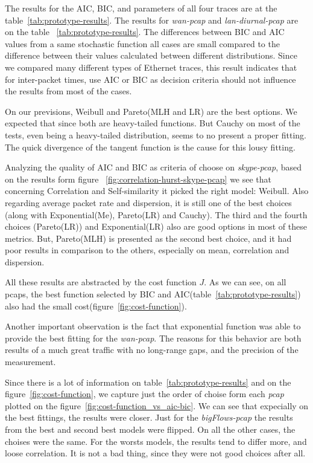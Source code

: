 The results for the AIC, BIC, and parameters of all four traces are at the table~\ref{tab:prototype-results}.  The results for \textit{wan-pcap} and \textit{lan-diurnal-pcap} are on the table ~\ref{tab:prototype-results}. The differences between BIC and AIC values from a same stochastic function all cases are small compared to the difference between their values calculated between different distributions. Since we compared many different types of Ethernet traces, this result indicates that for inter-packet times, use AIC or BIC as decision criteria should not influence the results from most of the cases. 

On our previsions, Weibull and Pareto(MLH and LR) are the best options. We expected that since both are heavy-tailed functions. But Cauchy on most of the tests, even being a heavy-tailed distribution, seems to no present a proper fitting. The quick divergence of the tangent function is the cause for this lousy fitting.

Analyzing the quality of AIC and BIC as criteria of choose on \textit{skype-pcap}, based on the results form figure ~\ref{fig:correlation-hurst-skype-pcap} we see that concerning Correlation and Self-similarity it picked the right model: Weibull. Also regarding average packet rate and dispersion, it is still one of the best choices (along with Exponential(Me), Pareto(LR) and Cauchy). The third and the fourth choices (Pareto(LR)) and Exponential(LR) also are good options in most of these metrics. But, Pareto(MLH) is presented as the second best choice, and it had poor results in comparison to the others, especially on mean, correlation and dispersion. 

All these results are abstracted by the cost function $J$. As we can see, on all pcaps, the best function selected by BIC and AIC(table~\ref{tab:prototype-results}) also had the small cost(figure~\ref{fig:cost-function}). 

Another important observation is the fact that exponential function was able to provide the best fitting for the \textit{wan-pcap}. The reasons for this behavior are both results of a much great traffic with no long-range gaps, and the precision of the measurement.


Since there is a lot of information on table~\ref{tab:prototype-results} and on the figure~\ref{fig:cost-function}, we capture just the order of choise form each \textit{pcap} plotted on the figure~\ref{fig:cost-function_vs_aic-bic}. We can see that expecially on the best fittings, the results were closer. Just for the \textit{bigFlows-pcap} the results from the best and second best models were flipped. On all the other cases, the choises were the same. For the worsts models, the results tend to differ more, and loose correlation. It is not a bad thing, since they were not good choices after all. 


